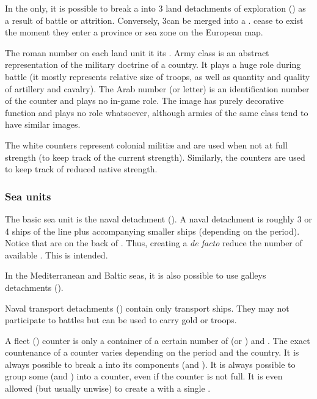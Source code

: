  In the \ROTW only, it is possible to break a
\LD into 3 land detachments of exploration (\LDE) as a result of battle or
attrition.
\bparag Conversely, 3\LDE can be merged into a \LD.
\bparag \LDE cease to exist the moment they enter a province or sea zone on
the European map.

 The roman number on each land unit it its .
\bparag Army class is an abstract representation of the military doctrine of a
country. It plays a huge role during battle (it mostly represents relative
size of troops, as well as quantity and quality of artillery and cavalry).
\bparag The Arab number (or letter) is an identification number of the counter
and plays no in-game role.
\bparag The image has purely decorative function and plays no role whatsoever,
although armies of the same class tend to have similar images.

\bparag The white counters represent colonial militi\ae{} and are used when
not at full strength (to keep track of the current strength).
\bparag Similarly, the  counters are used to keep track of
reduced native strength.


\subsubsection{Sea units}
\aparag[Detachments] The basic sea unit is the naval detachment (\ND). A naval
detachment is roughly 3 or 4 ships of the line plus accompanying smaller ships
(depending on the period).
\bparag Notice that \ND are on the back of \LD. Thus, creating a \ND \emph{de
  facto} reduce the number of available \LD. This is intended.

\aparag[Galleys] In the Mediterranean and Baltic seas, it is also possible to
use galleys detachments (\NGD).

\aparag[Transports] Naval transport detachments (\NTD) contain only transport
ships. They may not participate to battles but can be used to carry gold or
troops.

\aparag[Fleet] A fleet (\FLEET) counter is only a container of a certain
number of \ND (or \NGD) and \NTD.
\bparag The exact countenance of a \FLEET counter varies depending on the
period and the country.
\bparag It is always possible to break a \FLEET into its components (\ND and
\NTD).
\bparag It is always possible to group some \ND (and \NTD) into a \FLEET
counter, even if the counter is not full. It is even allowed (but usually
unwise) to create a \FLEET with a single \ND.

